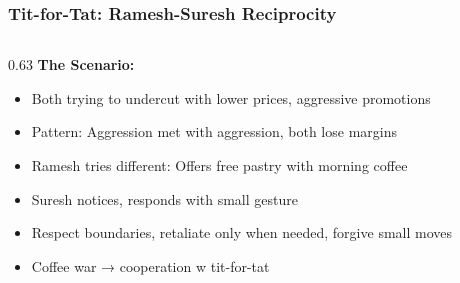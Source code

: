 \begin{frame}[fragile]\frametitle{Tit-for-Tat: Ramesh-Suresh Reciprocity}
\begin{columns}
    \begin{column}[T]{0.63\linewidth}
      \textbf{The Scenario:}
      \begin{itemize}
        \item Both trying to undercut with lower prices, aggressive promotions
        \item Pattern: Aggression met with aggression, both lose margins
        \item Ramesh tries different: Offers free pastry with morning coffee
        \item Suresh notices, responds with small gesture
        \item Respect boundaries, retaliate only when needed, forgive small moves
        \item Coffee war → cooperation w tit-for-tat
      \end{itemize}
      

\end{column}
\end{columns}
\end{frame}

